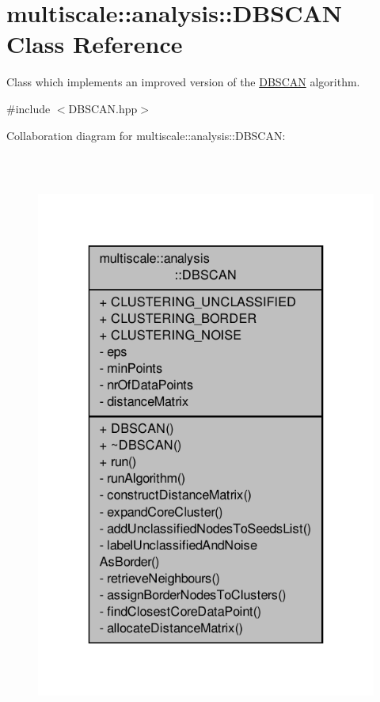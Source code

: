 \hypertarget{classmultiscale_1_1analysis_1_1DBSCAN}{\section{multiscale\-:\-:analysis\-:\-:\-D\-B\-S\-C\-A\-N \-Class \-Reference}
\label{classmultiscale_1_1analysis_1_1DBSCAN}
}


\-Class which implements an improved version of the \hyperlink{classmultiscale_1_1analysis_1_1DBSCAN}{\-D\-B\-S\-C\-A\-N} algorithm.  




{\ttfamily \#include $<$\-D\-B\-S\-C\-A\-N.\-hpp$>$}



\-Collaboration diagram for multiscale\-:\-:analysis\-:\-:\-D\-B\-S\-C\-A\-N\-:
\nopagebreak
\begin{figure}[H]
\begin{center}
\leavevmode
\includegraphics[height=550pt]{classmultiscale_1_1analysis_1_1DBSCAN__coll__graph}
\end{center}
\end{figure}
